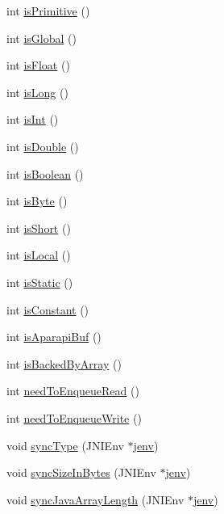 \begin{DoxyCompactItemize}
\item 
int \hyperlink{class_kernel_arg_a11ed28ef2892d605343092d77570c859}{is\-Primitive} ()
\item 
int \hyperlink{class_kernel_arg_ae38da6f0073ce862e16c2f21ef451d0b}{is\-Global} ()
\item 
int \hyperlink{class_kernel_arg_a80c129f34138199a1d6495e509a769f1}{is\-Float} ()
\item 
int \hyperlink{class_kernel_arg_a92b487c069a5e65ba49d56ab867329a3}{is\-Long} ()
\item 
int \hyperlink{class_kernel_arg_adcf1efdd8a1c804db121c7f466472716}{is\-Int} ()
\item 
int \hyperlink{class_kernel_arg_ac8b08f0b2210d4217dac92f27389f330}{is\-Double} ()
\item 
int \hyperlink{class_kernel_arg_a6eea48cf98d46f8d50ee53a1edcc195f}{is\-Boolean} ()
\item 
int \hyperlink{class_kernel_arg_ac4905b9b405fc2a93d05127516d6777f}{is\-Byte} ()
\item 
int \hyperlink{class_kernel_arg_a0b9156ed4ddabff7c63b39973c4f81a2}{is\-Short} ()
\item 
int \hyperlink{class_kernel_arg_ab4e2866a831ea45934cec64566fb4816}{is\-Local} ()
\item 
int \hyperlink{class_kernel_arg_aae70fdc4496f4c2f3847dc01e3acf97d}{is\-Static} ()
\item 
int \hyperlink{class_kernel_arg_a266bef2508f3aa4c1f2e670b7658f05e}{is\-Constant} ()
\item 
int \hyperlink{class_kernel_arg_a49be011b2c8ee9f85d507521854fb4f8}{is\-Aparapi\-Buf} ()
\item 
int \hyperlink{class_kernel_arg_a8e5e4bf1b90efaf6a805028f831968da}{is\-Backed\-By\-Array} ()
\item 
int \hyperlink{class_kernel_arg_a789786a4bb65c3ac76299474ee371c87}{need\-To\-Enqueue\-Read} ()
\item 
int \hyperlink{class_kernel_arg_a42f6eead7b43c2e0839aae776c09bcb3}{need\-To\-Enqueue\-Write} ()
\item 
void \hyperlink{class_kernel_arg_a8d734fc1a5ebd7893a59e62cd58b8494}{sync\-Type} (J\-N\-I\-Env $\ast$\hyperlink{aparapi_8cpp_a31595c73e9a3750524b2ff61b5a14f96}{jenv})
\item 
void \hyperlink{class_kernel_arg_a9562b79167d156ca9902a885042d63ed}{sync\-Size\-In\-Bytes} (J\-N\-I\-Env $\ast$\hyperlink{aparapi_8cpp_a31595c73e9a3750524b2ff61b5a14f96}{jenv})
\item 
void \hyperlink{class_kernel_arg_a121239122f29829dd24a8971a207951b}{sync\-Java\-Array\-Length} (J\-N\-I\-Env $\ast$\hyperlink{aparapi_8cpp_a31595c73e9a3750524b2ff61b5a14f96}{jenv})

\end{DoxyCompactItemize}
